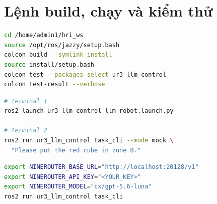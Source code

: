 \documentclass[12pt,a4paper]{article}
\begin{document}
\appendix
\section{Lệnh build, chạy và kiểm thử}

\begin{lstlisting}[language=bash,caption={Build và kiểm thử workspace.}]
cd /home/admin1/hri_ws
source /opt/ros/jazzy/setup.bash
colcon build --symlink-install
source install/setup.bash
colcon test --packages-select ur3_llm_control
colcon test-result --verbose
\end{lstlisting}

\begin{lstlisting}[language=bash,caption={Khởi chạy mô phỏng và kiểm thử không cần API key.}]
# Terminal 1
ros2 launch ur3_llm_control llm_robot.launch.py

# Terminal 2
ros2 run ur3_llm_control task_cli --mode mock \
  "Please put the red cube in zone B."
\end{lstlisting}

\begin{lstlisting}[language=bash,caption={Cấu hình LLM live qua 9Router; không ghi key thật vào báo cáo.}]
export NINEROUTER_BASE_URL="http://localhost:20128/v1"
export NINEROUTER_API_KEY="<YOUR_KEY>"
export NINEROUTER_MODEL="cx/gpt-5.6-luna"
ros2 run ur3_llm_control task_cli
\end{lstlisting}
\end{document}
